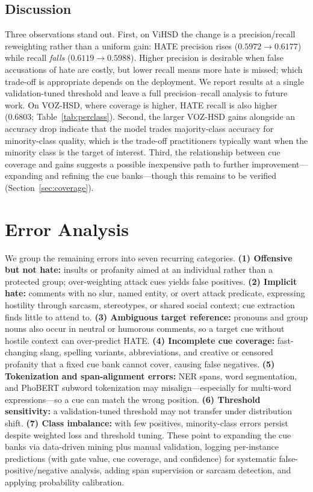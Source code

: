 \documentclass[11pt]{article}
\begin{document}
\subsection{Discussion}
Three observations stand out. First, on ViHSD the change is a precision/recall reweighting rather than a uniform gain: HATE precision rises ($0.5972\!\to\!0.6177$) while recall \emph{falls} ($0.6119\!\to\!0.5988$). Higher precision is desirable when false accusations of hate are costly, but lower recall means more hate is missed; which trade-off is appropriate depends on the deployment. We report results at a single validation-tuned threshold and leave a full precision--recall analysis to future work. On VOZ-HSD, where coverage is higher, HATE recall is also higher (0.6803; Table~\ref{tab:perclass}). Second, the larger VOZ-HSD gains alongside an accuracy drop indicate that the model trades majority-class accuracy for minority-class quality, which is the trade-off practitioners typically want when the minority class is the target of interest. Third, the relationship between cue coverage and gains suggests a possible inexpensive path to further improvement---expanding and refining the cue banks---though this remains to be verified (Section~\ref{sec:coverage}).

\section{Error Analysis}
We group the remaining errors into seven recurring categories. \textbf{(1) Offensive but not hate:} insults or profanity aimed at an individual rather than a protected group; over-weighting attack cues yields false positives. \textbf{(2) Implicit hate:} comments with no slur, named entity, or overt attack predicate, expressing hostility through sarcasm, stereotypes, or shared social context; cue extraction finds little to attend to. \textbf{(3) Ambiguous target reference:} pronouns and group nouns also occur in neutral or humorous comments, so a target cue without hostile context can over-predict HATE. \textbf{(4) Incomplete cue coverage:} fast-changing slang, spelling variants, abbreviations, and creative or censored profanity that a fixed cue bank cannot cover, causing false negatives. \textbf{(5) Tokenization and span-alignment errors:} NER spans, word segmentation, and PhoBERT subword tokenization may misalign---especially for multi-word expressions---so a cue can match the wrong position. \textbf{(6) Threshold sensitivity:} a validation-tuned threshold may not transfer under distribution shift. \textbf{(7) Class imbalance:} with few positives, minority-class errors persist despite weighted loss and threshold tuning. These point to expanding the cue banks via data-driven mining plus manual validation, logging per-instance predictions (with gate value, cue coverage, and confidence) for systematic false-positive/negative analysis, adding span supervision or sarcasm detection, and applying probability calibration.
\end{document}
